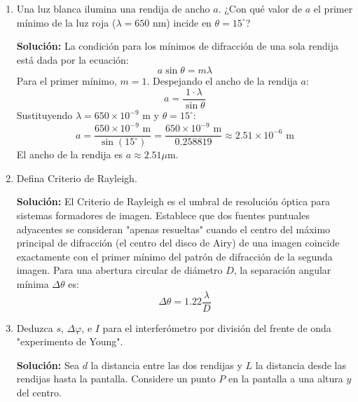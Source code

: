 \documentclass[12pt, letterpaper]{article}
\begin{document}
\begin{enumerate}
		\textbf{Solución:}
		El patrón de difracción se extiende siempre perpendicularmente a las líneas (ranuras) de la rejilla de difracción. Si las ranuras son verticales, los puntos o franjas de difracción se dispersarán horizontalmente.
		
		Esto sugiere y corrobora la naturaleza ondulatoria de la luz. Según el principio de Huygens-Fresnel, cada punto de una ranura actúa como una fuente secundaria de ondas esféricas; la superposición constructiva y destructiva de estas ondas a lo largo del eje perpendicular al confinamiento de la rejilla genera el patrón difractivo.
		
		\item Una luz blanca ilumina una rendija de ancho $a$. ¿Con qué valor de $a$ el primer mínimo de la luz roja ($\lambda=650\text{ nm}$) incide en $\theta=15^{\circ}$? 
		
		\textbf{Solución:}
		La condición para los mínimos de difracción de una sola rendija está dada por la ecuación:
		$$ a \sin\theta = m\lambda $$
		Para el primer mínimo, $m = 1$. Despejando el ancho de la rendija $a$:
		$$ a = \frac{1 \cdot \lambda}{\sin\theta} $$
		Sustituyendo $\lambda = 650 \times 10^{-9}\text{ m}$ y $\theta = 15^{\circ}$:
		$$ a = \frac{650 \times 10^{-9}\text{ m}}{\sin(15^{\circ})} = \frac{650 \times 10^{-9}\text{ m}}{0.258819} \approx 2.51 \times 10^{-6}\text{ m} $$
		El ancho de la rendija es $a \approx 2.51\mu\text{m}$.
		
		\item Defina Criterio de Rayleigh.
		
		\textbf{Solución:}
		El Criterio de Rayleigh es el umbral de resolución óptica para sistemas formadores de imagen. Establece que dos fuentes puntuales adyacentes se consideran "apenas resueltas" cuando el centro del máximo principal de difracción (el centro del disco de Airy) de una imagen coincide exactamente con el primer mínimo del patrón de difracción de la segunda imagen. 
		Para una abertura circular de diámetro $D$, la separación angular mínima $\Delta\theta$ es:
		$$ \Delta\theta = 1.22 \frac{\lambda}{D} $$
		
		\item Deduzca $s$, $\Delta\varphi$, e $I$ para el interferómetro por división del frente de onda "experimento de Young". 
		
		\textbf{Solución:}
		Sea $d$ la distancia entre las dos rendijas y $L$ la distancia desde las rendijas hasta la pantalla. Considere un punto $P$ en la pantalla a una altura $y$ del centro.
		

\end{enumerate}
\end{document}
